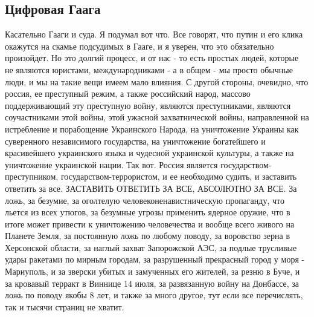  
 
 
 
 


\subsection{Цифровая Гаага}

Касательно Гааги и суда. Я подумал вот что. Все говорят, что путин и его клика
окажутся на скамье подсудимых в Гааге, и я уверен, что это обязательно
произойдет. Но это долгий процесс, и от нас - то есть простых людей, которые не
являются юристами, международниками - а в общем - мы просто обычные люди, и мы
на такие вещи имеем мало влияния. С другой стороны, очевидно, что россия, ее
преступный режим, а также российский народ, массово поддерживающий эту
преступную войну, являются преступниками, являются соучастниками этой войны,
этой ужасной захватнической войны, направленной на истребление и порабощение
Украинского Народа, на уничтожение Украины как суверенного независимого
государства, на уничтожение богатейшего и красивейшего украинского языка и
чудесной украинской культуры, а также на уничтожение украинской нации. Так вот.
Россия является государством-преступником, государством-террористом, и ее
необходимо судить, и заставить ответить за все. ЗАСТАВИТЬ ОТВЕТИТЬ ЗА ВСЕ,
АБСОЛЮТНО ЗА ВСЕ. За ложь, за безумие, за оголтелую человеконенавистническую
пропаганду, что льется из всех утюгов, за безумные угрозы применить ядерное
оружие, что в итоге может привести к уничтожению человечества и вообще всего
живого на Планете Земля, за постоянную ложь по любому поводу, за воровство
зерна в Херсонской области, за наглый захват Запорожской АЭС, за подлые
трусливые удары ракетами по мирным городам, за разрушенный прекрасный город у
моря - Мариуполь, и за зверски убитых и замученных его жителей, за резню в
Буче, и за кровавый терракт в Виннице 14 июля, за развязанную войну на
Донбассе, за ложь по поводу якобы 8 лет, и также за много другое, тут если все
перечислять, так и тысячи страниц не хватит.

